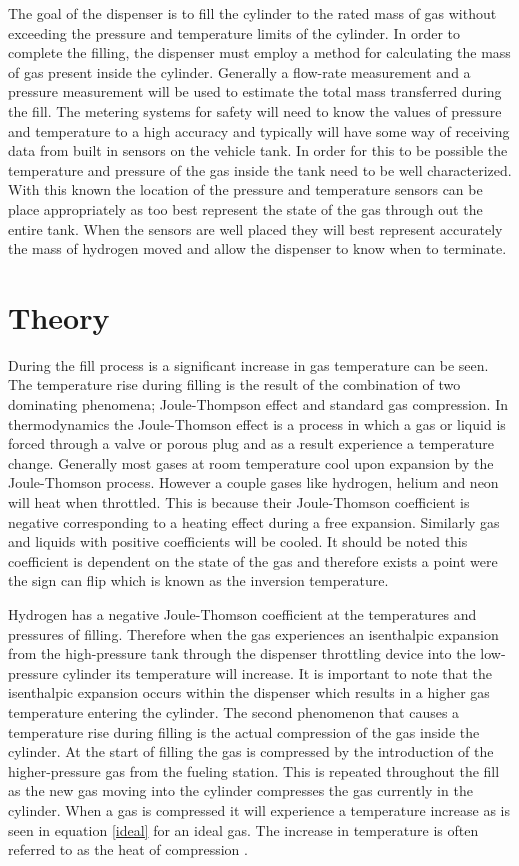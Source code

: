 \documentclass[paper=a4, fontsize=11pt, abstract=on]{scrartcl}
\numberwithin{equation}{section}		%
\numberwithin{figure}{section}			%
\numberwithin{table}{section}				%
\begin{document}
 The goal of the dispenser is to fill the cylinder to the rated mass of gas without exceeding the pressure and temperature limits of the cylinder. In order to complete the filling, the dispenser must employ a method for calculating the mass of gas present inside the cylinder. Generally a flow-rate measurement and a pressure measurement will be used to estimate the total mass transferred during the fill. The metering systems for safety will need to know the values of pressure and temperature to a high accuracy and typically will have some way of receiving data from built in sensors on the vehicle tank. In order for this to be possible the temperature and pressure of the gas inside the tank need to be well characterized. With this known the location of the pressure and temperature sensors can be place appropriately as too best represent the state of the gas through out the entire tank. When the sensors are well placed they will best represent accurately the mass of hydrogen moved and allow the dispenser to know when to terminate.



\section{Theory}

During the fill process is a significant increase in gas temperature can be seen. The temperature rise during filling is the result of the combination of two dominating phenomena; Joule-Thompson effect and standard gas compression. In thermodynamics the Joule-Thomson effect is a process in which a gas or liquid is forced through a valve or porous plug and as a result experience a temperature change. Generally most gases at room temperature cool upon expansion by the Joule-Thomson process. However a couple gases like hydrogen, helium and neon will heat when throttled. This is because their Joule-Thomson coefficient is negative corresponding to a heating effect during a free expansion. Similarly gas and liquids with positive coefficients will be cooled. It should be noted this coefficient is dependent on the state of the gas and therefore exists a point were the sign can flip which is known as the inversion temperature. 

Hydrogen has a negative Joule-Thomson coefficient at the temperatures and pressures of filling. Therefore when the gas experiences an isenthalpic expansion from the high-pressure tank through the dispenser throttling device into the low-pressure cylinder its temperature will increase. It is important to note that the isenthalpic expansion occurs within the dispenser which results in a higher gas temperature entering the cylinder.
The second phenomenon that causes a temperature rise during filling is the actual compression of the gas inside the cylinder. At the start of filling the gas is compressed by the introduction of the higher-pressure gas from the fueling station. This is repeated throughout the fill as the new gas moving into the cylinder compresses the gas currently in the cylinder. When a gas is compressed it will experience a temperature increase as is seen in equation \ref{ideal} for an ideal gas. The increase in temperature is often referred to as the heat of compression \cite{dick}. 
\end{document}
